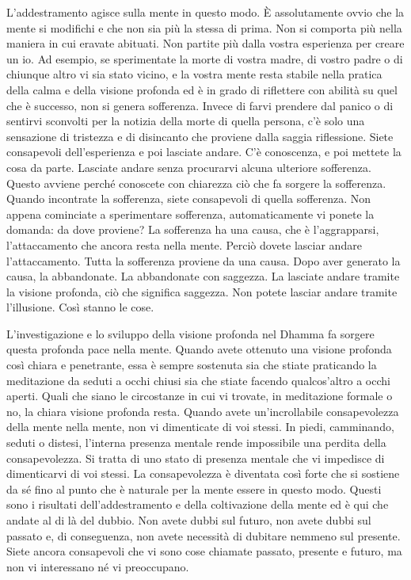 L'addestramento agisce sulla mente in questo modo. È assolutamente ovvio
che la mente si modifichi e che non sia più la stessa di prima. Non si
comporta più nella maniera in cui eravate abituati. Non partite più
dalla vostra esperienza per creare un io. Ad esempio, se sperimentate la
morte di vostra madre, di vostro padre o di chiunque altro vi sia stato
vicino, e la vostra mente resta stabile nella pratica della calma e
della visione profonda ed è in grado di riflettere con abilità su quel
che è successo, non si genera sofferenza. Invece di farvi prendere dal
panico o di sentirvi sconvolti per la notizia della morte di quella
persona, c'è solo una sensazione di tristezza e di disincanto che
proviene dalla saggia riflessione. Siete consapevoli dell'esperienza e
poi lasciate andare. C'è conoscenza, e poi mettete la cosa da parte.
Lasciate andare senza procurarvi alcuna ulteriore sofferenza. Questo
avviene perché conoscete con chiarezza ciò che fa sorgere la sofferenza.
Quando incontrate la sofferenza, siete consapevoli di quella sofferenza.
Non appena cominciate a sperimentare sofferenza, automaticamente vi
ponete la domanda: da dove proviene? La sofferenza ha una causa, che è
l'aggrapparsi, l'attaccamento che ancora resta nella mente. Perciò
dovete lasciar andare l'attaccamento. Tutta la sofferenza proviene da
una causa. Dopo aver generato la causa, la abbandonate. La abbandonate
con saggezza. La lasciate andare tramite la visione profonda, ciò che
significa saggezza. Non potete lasciar andare tramite l'illusione. Così
stanno le cose.

L'investigazione e lo sviluppo della visione profonda nel Dhamma fa
sorgere questa profonda pace nella mente. Quando avete ottenuto una
visione profonda così chiara e penetrante, essa è sempre sostenuta sia
che stiate praticando la meditazione da seduti a occhi chiusi sia che
stiate facendo qualcos'altro a occhi aperti. Quali che siano le
circostanze in cui vi trovate, in meditazione formale o no, la chiara
visione profonda resta. Quando avete un'incrollabile consapevolezza
della mente nella mente, non vi dimenticate di voi stessi. In piedi,
camminando, seduti o distesi, l'interna presenza mentale rende
impossibile una perdita della consapevolezza. Si tratta di uno stato di
presenza mentale che vi impedisce di dimenticarvi di voi stessi. La
consapevolezza è diventata così forte che si sostiene da sé fino al
punto che è naturale per la mente essere in questo modo. Questi sono i
risultati dell'addestramento e della coltivazione della mente ed è qui
che andate al di là del dubbio. Non avete dubbi sul futuro, non avete
dubbi sul passato e, di conseguenza, non avete necessità di dubitare
nemmeno sul presente. Siete ancora consapevoli che vi sono cose chiamate
passato, presente e futuro, ma non vi interessano né vi preoccupano.

